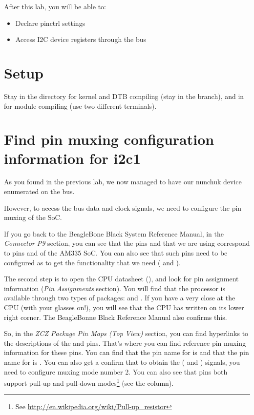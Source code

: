 
After this lab, you will be able to:

\begin{itemize}
\item Declare pinctrl settings
\item Access I2C device registers through the bus
\end{itemize}

\section{Setup}

Stay in the  directory for kernel and DTB
compiling (stay in the  branch), and in
 for module compiling
(use two different terminals).

\section{Find pin muxing configuration information for i2c1}

As you found in the previous lab, we now managed to have our nunchuk
device enumerated on the  bus.

However, to access the bus data and clock signals, we need to configure
the pin muxing of the SoC.

If you go back to the BeagleBone Black System Reference Manual, in the
{\em Connector P9} section, you can see that the pins  and
 that we are using correspond to pins  and 
of the AM335 SoC. You can also see that such pins need to be configured 
as  to get the functionality that we need (
and ).

The second step is to open the CPU datasheet (), and
look for pin assignment information ({\em Pin Assignments} section).
You will find that the processor is available through two types of
packages:  and . If you have a very close at the CPU
(with your glasses on!), you will see that the CPU has  written
on its lower right corner. The BeagleBonne Black Reference Manual also
confirms this.

So, in the {\em ZCZ Package Pin Maps (Top View)} section, you can find 
hyperlinks to the descriptions of the  and  pins. 
That's where you can find reference pin muxing information for these
pins.  You can find that the pin name for  is 
and that the pin name for  is .
You can also get a confirm that to obtain the ( and
) signals, you need to configure muxing mode number 2.
You can also see that pins both support pull-up and pull-down
modes\footnote{See \url{http://en.wikipedia.org/wiki/Pull-up_resistor}}
(see the  column).

